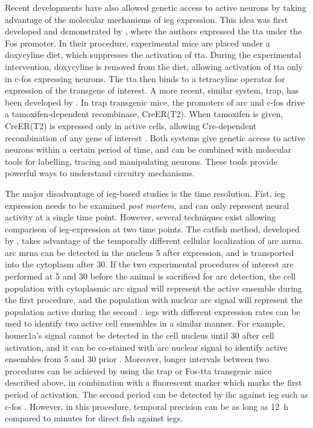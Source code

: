 Recent developments have also allowed genetic access to active neurons by taking advantage of the molecular mechanisms of \gls{ieg} expression. This idea was first developed and demonstrated by \citet{reijmers07}, where the authors expressed the \gls{tta} under the Fos promoter. In their procedure, experimental mice are placed under a doxycyline diet, which suppresses the activation of \gls{tta}. During the experimental intervention, doxycyline is removed from the diet, allowing activation of \gls{tta} only in c-fos expressing neurons. The \gls{tta} then binds to a tetracyline operator for expression of the transgene of interest. A more recent, similar system, \gls{trap}, has been developed by \citet{guenthner13}. In \gls{trap} transgenic mice, the promoters of \gls{arc} and c-fos drive a tamoxifen-dependent recombinase, CreER(T2). When tamoxifen is given, CreER(T2) is expressed only in active cells, allowing Cre-dependent recombination of any gene of interest \citep{guenthner13}. Both systems give genetic access to active neurons within a certain period of time, and can be combined with molecular tools for labelling, tracing and manipulating neurons. These tools provide powerful ways to understand circuitry mechanisms.

The major disadvantage of \gls{ieg}-based studies is the time resolution. Fist, \gls{ieg} expression needs to be examined \textit{post mortem}, and can only represent neural activity at a single time point. However, several techniques exist allowing comparison of \gls{ieg}-expression at two time points. The \gls{catfish} method, developed by \citet{guzowski99}, takes advantage of the temporally different cellular localization of \gls{arc} \gls{mrna}. \Gls{arc} \gls{mrna} can be detected in the nucleus \SI{5}{\min} after expression, and is transported into the cytoplasm after \SI{30}{\min}. If the two experimental procedures of interest are performed at \SI{5}{\min} and \SI{30}{\min} before the animal is sacrificed for \gls{arc} detection, the cell population with cytoplasmic \gls{arc} signal will represent the active ensemble during the first procedure, and the population with nuclear \gls{arc} signal will represent the population active during the second \citep{guzowski99}. \Glspl{ieg} with different expression rates can be used to identify two active cell ensembles in a similar manner. For example, homer1a's signal cannot be detected in the cell nucleus until \SI{30}{\min} after cell activation, and it can be co-stained with \gls{arc} nuclear signal to identify active ensembles from \SI{5}{\min} and \SI{30}{\min} prior \citep{vazdarjanova04}. Moreover, longer intervals between two procedures can be achieved by using the \gls{trap} or Fos-\gls{tta} transgenic mice described above, in combination with a fluorescent marker which marks the first period of activation. The second period can be detected by \gls{ihc} against \gls{ieg} such as c-fos \citep{reijmers07, guenthner13}. However, in this procedure, temporal precision can be as long as \SI{12}{\hour} compared to minutes for direct \gls{fish} against \glspl{ieg}.

